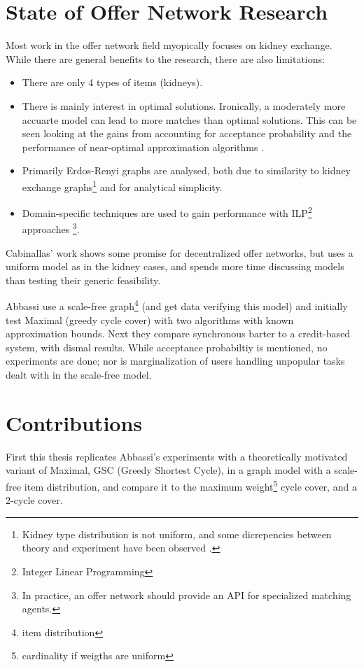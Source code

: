 \documentclass[main.tex]{subfiles}
\begin{document}
\section{State of Offer Network Research}
Most work in the offer network field myopically focuses on kidney exchange. While there are general benefits to the research, there are also limitations:
\begin{itemize}
  \item There are only 4 types of items (kidneys).
  \item There is mainly interest in optimal solutions. Ironically, a moderately more accuarte model can lead to more matches than optimal solutions. This can be seen looking at the gains from accounting for acceptance probability \cite{Dick} \cite{Dick3} and the performance of near-optimal approximation algorithms \cite{Jia1}.
  \item Primarily Erdos-Renyi graphs are analysed, both due to similarity to kidney exchange graphs\footnote{Kidney type distribution is not uniform, and some dicrepencies between theory and experiment have been observed \cite{Dick}.} and for analytical simplicity.
  \item Domain-specific techniques are used to gain performance with ILP\footnote{Integer Linear Programming} approaches \cite{Dick} \cite{Dick1} \cite{Dick2} \cite{Glo1} \cite{And3} \footnote{In practice, an offer network should provide an API for specialized matching agents.}.
\end{itemize}

Cabinallas' work \cite{Cab0} shows some promise for decentralized offer networks, but uses a uniform model as in the kidney cases, and spends more time discussing models than testing their generic feasibility.

Abbassi \cite{Abb1} \cite{Abb2} use a scale-free graph\footnote{item distribution} (and get data verifying this model) and initially test Maximal (greedy cycle cover) with two algorithms with known approximation bounds. Next they compare synchronous barter to a credit-based system, with dismal results. While acceptance probabiltiy is mentioned, no experiments are done; nor is marginalization of users handling unpopular tasks dealt with in the scale-free model.

\section{Contributions}
First this thesis replicates Abbassi's experiments \cite{Abb1} with a theoretically motivated variant of Maximal, GSC (Greedy Shortest Cycle), in a graph model with a scale-free item distribution, and compare it to the maximum weight\footnote{cardinality if weigths are uniform} cycle cover, and a 2-cycle cover.
\end{document}
